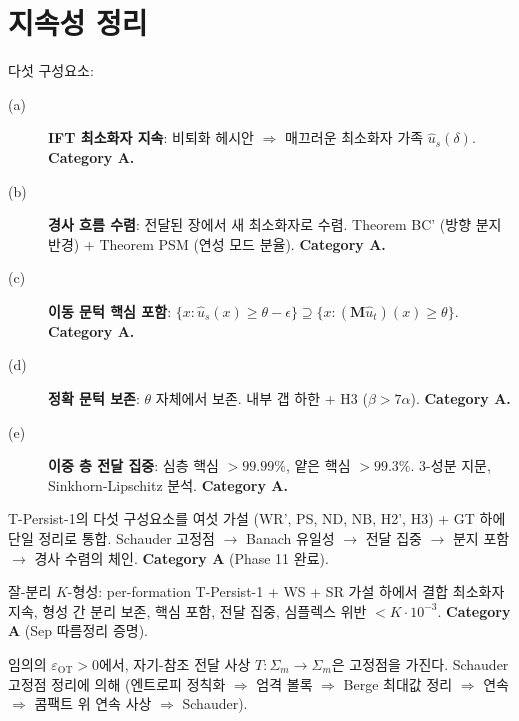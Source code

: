 \section{지속성 정리}
\label{sec:persistence-theorems}

\begin{theorem}
\label{thm:T-Persist-1}
다섯 구성요소:
\begin{description}
    \item[(a)] \textbf{IFT 최소화자 지속}: 비퇴화 헤시안 $\Rightarrow$ 매끄러운 최소화자 가족 $\hat{u}_s(\delta)$. \textbf{Category A.}
    \item[(b)] \textbf{경사 흐름 수렴}: 전달된 장에서 새 최소화자로 수렴. Theorem BC' (방향 분지 반경) + Theorem PSM (연성 모드 분율). \textbf{Category A.}
    \item[(c)] \textbf{이동 문턱 핵심 포함}: $\{x : \hat{u}_s(x) \geq \theta - \epsilon\} \supseteq \{x : (\mathbf{M}\hat{u}_t)(x) \geq \theta\}$. \textbf{Category A.}
    \item[(d)] \textbf{정확 문턱 보존}: $\theta$ 자체에서 보존. 내부 갭 하한 + H3 ($\beta > 7\alpha$). \textbf{Category A.}
    \item[(e)] \textbf{이중 층 전달 집중}: 심층 핵심 $> 99.99\%$, 얕은 핵심 $> 99.3\%$. 3-성분 지문, Sinkhorn-Lipschitz 분석. \textbf{Category A.}
\end{description}
\end{theorem}

\begin{theorem}
\label{thm:T-Persist-Full}
T-Persist-1의 다섯 구성요소를 여섯 가설 (WR', PS, ND, NB, H2', H3) + GT 하에 단일 정리로 통합. Schauder 고정점 $\to$ Banach 유일성 $\to$ 전달 집중 $\to$ 분지 포함 $\to$ 경사 수렴의 체인. \textbf{Category A} (Phase 11 완료).
\end{theorem}

\begin{theorem}
\label{thm:T-Persist-K-Sep}
잘-분리 $K$-형성: per-formation T-Persist-1 + WS + SR 가설 하에서 결합 최소화자 지속, 형성 간 분리 보존, 핵심 포함, 전달 집중, 심플렉스 위반 $< K \cdot 10^{-3}$. \textbf{Category A} (Sep 따름정리 증명).
\end{theorem}

\begin{theorem}[자기-참조 전달 고정점 존재]
\label{thm:fixed-point}
임의의 $\varepsilon_{\mathrm{OT}} > 0$에서, 자기-참조 전달 사상 $T : \Sigma_m \to \Sigma_m$은 고정점을 가진다. Schauder 고정점 정리에 의해 (엔트로피 정칙화 $\Rightarrow$ 엄격 볼록 $\Rightarrow$ Berge 최대값 정리 $\Rightarrow$ 연속 $\Rightarrow$ 콤팩트 위 연속 사상 $\Rightarrow$ Schauder).
\end{theorem}

